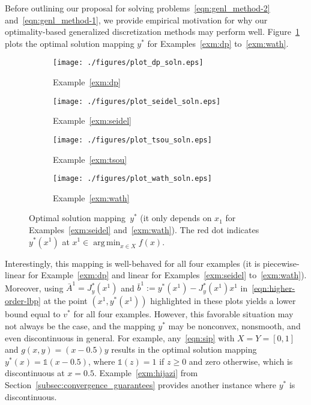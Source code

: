 \documentclass{article}
\DeclareMathOperator*{\argmin}{arg\,min}
\newcommand{\1}[1]{\mathds{1}\left[#1\right]}
\begin{document}
Before outlining our proposal for solving problems~\eqref{eqn:genl_method-2} and~\eqref{eqn:genl_method-1}, we provide empirical motivation for why our optimality-based generalized discretization methods may perform well.
Figure~\ref{fig:optimal_soln} plots the optimal solution mapping $y^*$ for Examples~\ref{exm:dp} to~\ref{exm:wath}.
\begin{figure}[t]
\centering
\begin{subfigure}{0.245\textwidth}
\texttt{[image: ./figures/plot\_dp\_soln.eps]}
    \caption{Example~\ref{exm:dp}}
\end{subfigure}%
\begin{subfigure}{0.245\textwidth}
\texttt{[image: ./figures/plot\_seidel\_soln.eps]}
\caption{Example~\ref{exm:seidel}}
\end{subfigure}%
\begin{subfigure}{0.245\textwidth}
\texttt{[image: ./figures/plot\_tsou\_soln.eps]}
    \caption{Example~\ref{exm:tsou}}
\end{subfigure}%
\begin{subfigure}{0.245\textwidth}
\texttt{[image: ./figures/plot\_wath\_soln.eps]}
    \caption{Example~\ref{exm:wath}}
\end{subfigure}
\caption{Optimal solution mapping~$y^*$ (it only depends on $x_1$ for Examples~\ref{exm:seidel} and~\ref{exm:wath}). The red dot indicates $y^*(x^1)$ at $x^1 \in \argmin_{x \in X} f(x)$.}
\label{fig:optimal_soln}
\end{figure}
Interestingly, this mapping is well-behaved for all four examples (it is piecewise-linear for Example~\ref{exm:dp} and linear for Examples~\ref{exm:seidel} to~\ref{exm:wath}).
Moreover, using $\bar{A}^1 = J^*_y(x^1)$ and $\bar{b}^1 := y^*(x^1) - J^*_y(x^1) x^1$ in~\eqref{eqn:higher-order-lbp} at the point $(x^1, y^*(x^1))$ highlighted in these plots yields a lower bound equal to $v^*$ for all four examples.
However, this favorable situation may not always be the case, and the mapping $y^*$ may be nonconvex, nonsmooth, and even discontinuous in general.
For example, any~\eqref{eqn:sip} with $X = Y = [0,1]$ and $g(x,y) = (x - 0.5)y$ results in the optimal solution mapping $y^*(x) = \mathds{1}(x - 0.5)$, where $\mathds{1}(z) = 1$ if $z \geq 0$ and zero otherwise, which is discontinuous at $x = 0.5$.
Example~\ref{exm:hijazi} from Section~\ref{subsec:convergence_guarantees} provides another instance where $y^*$ is discontinuous.
\end{document}
